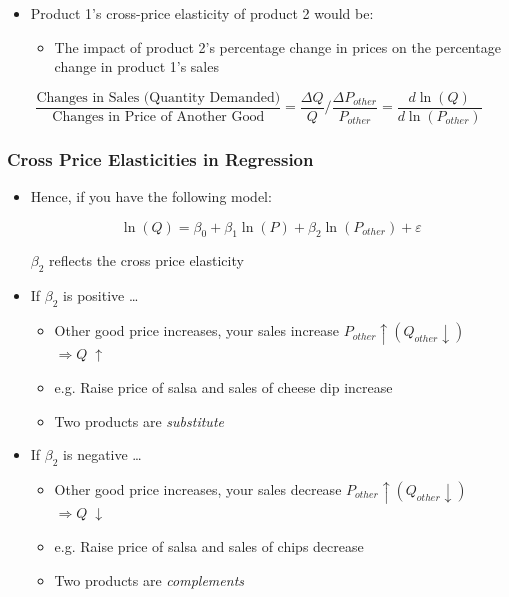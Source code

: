 \documentclass[10pt,article]{article}
\begin{document}
\begin{itemize}
\item Product 1's cross-price elasticity of product 2 would be:

\begin{itemize}
\item The impact of product 2's percentage change in prices on the percentage
change in product 1's sales
\end{itemize}
\end{itemize}

\[ \dfrac{\text{Changes in Sales (Quantity Demanded)}}{\text{Changes in
Price of Another Good}} = \dfrac{\Delta Q}{Q} \Bigg/ \dfrac{\Delta
P_{other}}{P_{other}} = \dfrac{d \ln (Q)}{d \ln (P_{other})} \]
\subsubsection{Cross Price Elasticities in Regression}
\label{sec:org4179428}
\begin{itemize}
\item Hence, if you have the following model:

\[ \ln(Q) = \beta_0 + \beta_1\ln(P) + \beta_2\ln(P_{other}) + \varepsilon \]

\(\beta_{2}\) reflects the cross price elasticity
\end{itemize}

\begin{itemize}
\item If \(\beta_2\) is positive \ldots{}
\begin{itemize}
\item Other good price increases, your sales  increase 
 \( P_{other} \uparrow (Q_{other} \downarrow) \)  \(\Rightarrow Q\;\uparrow \)
\item e.g. Raise price of salsa and sales of cheese dip increase
\item Two products are \emph{substitute}
\end{itemize}
\end{itemize}

\begin{itemize}
\item If \(\beta_2\) is negative \ldots{}
\begin{itemize}
\item Other good price increases, your sales  decrease
 \( P_{other} \uparrow (Q_{other} \downarrow) \)  \( \Rightarrow Q\;\downarrow \)
\item e.g. Raise price of salsa and sales of chips decrease
\item Two products are \emph{complements}
\end{itemize}
\end{itemize}
\end{document}
